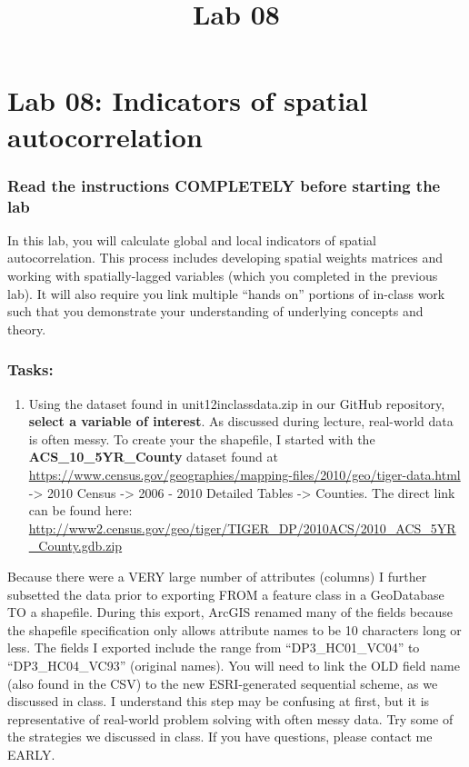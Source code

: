 \documentclass[]{article}
\title{Lab 08}
\author{}
\date{}
\makeatletter
\providecommand{\tightlist}{%
  \setlength{\itemsep}{0pt}\setlength{\parskip}{0pt}}
\renewcommand{\maketitle}{\bgroup\vspace*{-1cm}\setlength{\parindent}{0pt}
\begin{flushleft}
  \@author
  
  \@date
  
\end{flushleft}\egroup
}
\makeatother
\begin{document}
\maketitle

\hypertarget{lab-08-indicators-of-spatial-autocorrelation}{%
\section{Lab 08: Indicators of spatial
autocorrelation}\label{lab-08-indicators-of-spatial-autocorrelation}}

\hypertarget{read-the-instructions-completely-before-starting-the-lab}{%
\subsubsection{Read the instructions COMPLETELY before starting the
lab}\label{read-the-instructions-completely-before-starting-the-lab}}

In this lab, you will calculate global and local indicators of spatial
autocorrelation. This process includes developing spatial weights
matrices and working with spatially-lagged variables (which you
completed in the previous lab). It will also require you link multiple
``hands on'' portions of in-class work such that you demonstrate your
understanding of underlying concepts and theory.

\hypertarget{tasks}{%
\subsubsection{Tasks:}\label{tasks}}

\begin{enumerate}
\def\labelenumi{\arabic{enumi}.}
\tightlist
\item
  Using the dataset found in unit12inclassdata.zip in our GitHub
  repository, \textbf{select a variable of interest}. As discussed
  during lecture, real-world data is often messy. To create your the
  shapefile, I started with the \textbf{ACS\_10\_5YR\_County} dataset
  found at
  \url{https://www.census.gov/geographies/mapping-files/2010/geo/tiger-data.html}
  -\textgreater{} 2010 Census -\textgreater{} 2006 - 2010 Detailed
  Tables -\textgreater{} Counties. The direct link can be found here:
  \url{http://www2.census.gov/geo/tiger/TIGER_DP/2010ACS/2010_ACS_5YR_County.gdb.zip}
\end{enumerate}

Because there were a VERY large number of attributes (columns) I further
subsetted the data prior to exporting FROM a feature class in a
GeoDatabase TO a shapefile. During this export, ArcGIS renamed many of
the fields because the shapefile specification only allows attribute
names to be 10 characters long or less. The fields I exported include
the range from ``DP3\_HC01\_VC04'' to ``DP3\_HC04\_VC93'' (original
names). You will need to link the OLD field name (also found in the CSV)
to the new ESRI-generated sequential scheme, as we discussed in class. I
understand this step may be confusing at first, but it is representative
of real-world problem solving with often messy data. Try some of the
strategies we discussed in class. If you have questions, please contact
me EARLY.
\end{document}

